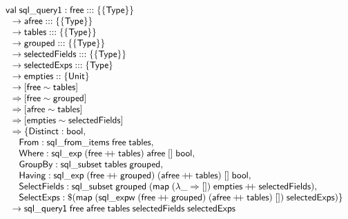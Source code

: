 \documentclass{article}
\newcommand{\mt}[1]{\mathsf{#1}}
\newcommand{\rc}{+ \hspace{-.075in} + \;}
\begin{document}
$$\begin{array}{l}
  \mt{val} \; \mt{sql\_query1} : \mt{free} ::: \{\{\mt{Type}\}\} \\
  \hspace{.1in} \to \mt{afree} ::: \{\{\mt{Type}\}\} \\
  \hspace{.1in} \to \mt{tables} ::: \{\{\mt{Type}\}\} \\
  \hspace{.1in} \to \mt{grouped} ::: \{\{\mt{Type}\}\} \\
  \hspace{.1in} \to \mt{selectedFields} ::: \{\{\mt{Type}\}\} \\
  \hspace{.1in} \to \mt{selectedExps} ::: \{\mt{Type}\} \\
  \hspace{.1in} \to \mt{empties} :: \{\mt{Unit}\} \\
  \hspace{.1in} \to [\mt{free} \sim \mt{tables}] \\
  \hspace{.1in} \Rightarrow [\mt{free} \sim \mt{grouped}] \\
  \hspace{.1in} \Rightarrow [\mt{afree} \sim \mt{tables}] \\
  \hspace{.1in} \Rightarrow [\mt{empties} \sim \mt{selectedFields}] \\
  \hspace{.1in} \Rightarrow \{\mt{Distinct} : \mt{bool}, \\
  \hspace{.2in} \mt{From} : \mt{sql\_from\_items} \; \mt{free} \; \mt{tables}, \\
  \hspace{.2in} \mt{Where} : \mt{sql\_exp} \; (\mt{free} \rc \mt{tables}) \; \mt{afree} \; [] \; \mt{bool}, \\
  \hspace{.2in} \mt{GroupBy} : \mt{sql\_subset} \; \mt{tables} \; \mt{grouped}, \\
  \hspace{.2in} \mt{Having} : \mt{sql\_exp} \; (\mt{free} \rc \mt{grouped}) \; (\mt{afree} \rc \mt{tables}) \; [] \; \mt{bool}, \\
  \hspace{.2in} \mt{SelectFields} : \mt{sql\_subset} \; \mt{grouped} \; (\mt{map} \; (\lambda \_ \Rightarrow []) \; \mt{empties} \rc \mt{selectedFields}), \\
  \hspace{.2in} \mt {SelectExps} : \$(\mt{map} \; (\mt{sql\_expw} \; (\mt{free} \rc \mt{grouped}) \; (\mt{afree} \rc \mt{tables}) \; []) \; \mt{selectedExps}) \} \\
  \hspace{.1in} \to \mt{sql\_query1} \; \mt{free} \; \mt{afree} \; \mt{tables} \; \mt{selectedFields} \; \mt{selectedExps}
\end{array}$$
\end{document}
